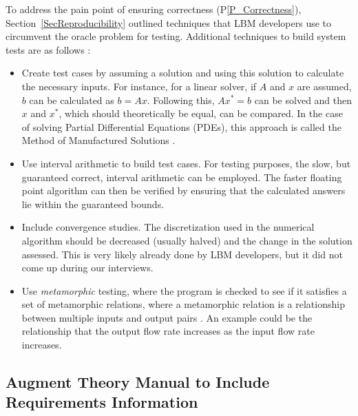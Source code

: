 \documentclass[final, 3p, times, authoryear]{elsarticle}
\newcommand{\ppref}[1]{P\ref{#1}}
\begin{document}
To address the pain point of ensuring correctness (\ppref{P_Correctness}),
Section~\ref{SecReproducibility} outlined techniques that LBM developers use to
circumvent the oracle problem for testing.  Additional techniques to build
system tests are as follows \citep{Smith2016}: 

\begin{itemize}

\item Create test cases by assuming a solution and using this solution to
  calculate the necessary inputs.  For instance, for a linear solver, if $A$ and
  $x$ are assumed, $b$ can be calculated as $b = A x$.  Following this, $A x^* =
  b$ can be solved and then $x$ and $x^*$, which should theoretically be equal,
  can be compared.  In the case of solving Partial Differential Equations
  (PDEs), this approach is called the Method of Manufactured Solutions
  \citep{Roache1998}.
\item Use interval arithmetic to build test cases.  For testing purposes, the
  slow, but guaranteed correct, interval arithmetic \citep{Hickey2001} can be
  employed. The faster floating point algorithm can then be verified by ensuring
  that the calculated answers lie within the guaranteed bounds.
\item Include convergence studies.  The discretization used in the numerical
  algorithm should be decreased (usually halved) and the change in the solution
  assessed.  This is very likely already done by LBM developers, but it did not
  come up during our interviews.
\item Use \emph{metamorphic} testing, where the program is checked to see if it
  satisfies a set of metamorphic relations, where a metamorphic relation is a
  relationship between multiple inputs and output pairs
  \citep{KanewalaAndLundgren2016}.  An example could be the relationship that
  the output flow rate increases as the input flow rate increases.
\end{itemize}

\subsection{Augment Theory Manual to Include Requirements Information}
\end{document}
